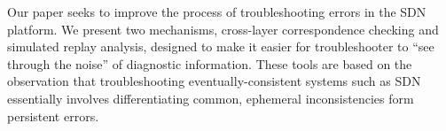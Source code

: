 Our paper seeks to improve the process of troubleshooting errors in the SDN
platform. We present two mechanisms, cross-layer correspondence checking
and simulated replay analysis, 
designed to make it easier for troubleshooter to ``see through the noise'' of
diagnostic information. These tools are based on the observation that 
troubleshooting eventually-consistent systems such as SDN essentially
involves differentiating common, ephemeral inconsistencies form persistent
errors.
